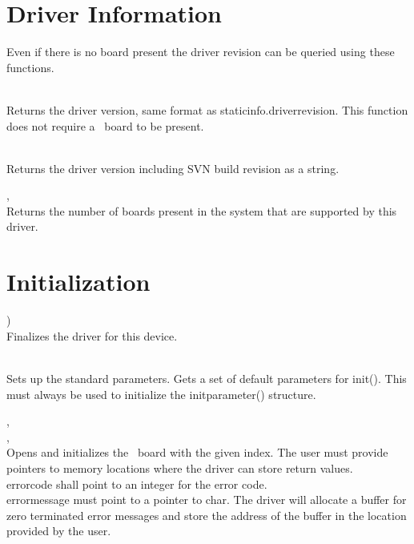\section{Driver Information}

	Even if there is no board present the driver revision can be queried using these functions.

	\\
	Returns the driver version, same format as \textsf{\prefix static\tu info.driver\tu revision}. 
	This function does not require a \deviceName\ board to be present.

	\\
	Returns the driver version including SVN build revision as a string. 

	, \\
	\label{countdevices}
	Returns the number of boards present in the system that are supported by this driver.\par


\section {Initialization}

		\device )\\
		Finalizes the driver for this device.

		\\
		Sets up the standard parameters. Gets a set of default parameters for \textsf{\prefix init()}. This must always be used to initialize the \textsf{\prefix init\tu parameter()} structure.\par

		, \\ 
		, \\
		Opens and initializes the \deviceName\ board with the given index. 
		The user must provide pointers to memory locations where the driver can store return values.\\
		\textsf{error\tu code} shall point to an integer for the error code. \\
		\textsf{error\tu message} must point to a pointer to char. The driver will allocate a buffer for zero terminated error messages and store the address of the buffer in the location provided by the user.\par

